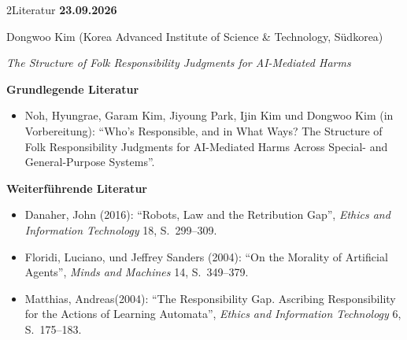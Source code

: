 \documentclass[xcolor=table,9pt,aspectratio=169]{beamer}
\begin{document}
\begin{frame}{\vspace*{10mm}2\hspace*{1em}Literatur}
\textbf{23.09.2026}

\smallskip
Dongwoo Kim (Korea Advanced Institute of Science \& Technology, Südkorea)

\medskip
\textit{The Structure of Folk Responsibility Judgments for AI-Mediated Harms}


\medskip
\textbf{Grundlegende Literatur}
{\footnotesize
\begin{itemize}[label=,leftmargin=2em,itemindent=-2em]
   \item Noh, Hyungrae, Garam Kim, Jiyoung Park, Ijin Kim und Dongwoo Kim (in Vorbereitung): \enquote{Who’s Responsible, and in What Ways? The Structure of Folk Responsibility Judgments for AI-Mediated Harms Across Special- and General-Purpose Systems}.
\end{itemize}
}

\medskip
\textbf{Weiterführende Literatur}
{\footnotesize
\begin{itemize}[label=,leftmargin=2em,itemindent=-2em]
   \item Danaher, John (2016): \enquote{Robots, Law and the Retribution Gap}, \textit{Ethics and Information Technology} 18, S.~299--309.
   \item Floridi, Luciano, und Jeffrey Sanders (2004): \enquote{On the Morality of Artificial Agents}, \textit{Minds and Machines} 14, S.~349--379.
   \item Matthias, Andreas(2004): \enquote{The Responsibility Gap. Ascribing Responsibility for the Actions of Learning Automata}, \textit{Ethics and Information Technology} 6, S.~175--183.
\end{itemize}
}
\end{frame}
\end{document}

